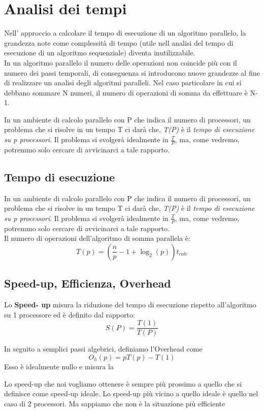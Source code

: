 \documentclass{article}
\begin{document}
\section{Analisi dei tempi}
Nell' approccio a calcolare il tempo di esecuzione di un algoritmo parallelo, la grandezza note come complessità di tempo (utile nell analisi del tempo di esecuzione di un algoritmo sequenziale) diventa inutilizzabile.\\
In un algoritmo parallelo il numero delle operazioni non coincide più con il numero dei passi temporali, di conseguenza si introducono nuove grandezze al fine di realizzare un analisi degli algoritmi paralleli. Nel caso particolare in cui si debbano sommare N numeri, il numero di operazioni di somma da effettuare è N-1.

In un ambiente di calcolo parallelo con P che indica il numero di processori, un problema che si risolve in un tempo T ci darà che, \textit{T(P)} è il \textit{tempo di esecuzione su p processori}. Il problema si svolgerà idealmente in $\frac{T}{P}$, ma, come vedremo, potremmo solo cercare di avvicinarci a tale rapporto. 

\subsection{Tempo di esecuzione}
In un ambiente di calcolo parallelo con P che indica il numero di processori, un problema che si risolve in un tempo T ci darà che, \textit{T(P)} è il \textit{tempo di esecuzione su p processori}. Il problema si svolgerà idealmente in $\frac{T}{P}$, ma, come vedremo, potremmo solo cercare di avvicinarci a tale rapporto.\\
Il numero di operazioni dell'algoritmo di somma parallela è:
$$T(p)=(\frac{n}{p}-1 + \log_2(p))t_{calc}$$

\subsection{Speed-up, Efficienza, Overhead}

Lo \textbf{Speed- up} misura la riduzione del tempo di esecuzione rispetto all'algoritmo su 1 processore ed è definito dal rapporto:
$$ S(P) = \frac{T(1)}{T(P)} $$ 

In seguito a semplici passi algebrici, definiamo l'Overhead come
$$O_h(p) = pT(p) - T(1)$$
Esso è idealmente nullo e misura la 

Lo speed-up che noi vogliamo ottenere è sempre più prossimo a quello che si definisce come speed-up ideale.
Lo speed-up più vicino a quello ideale è quello nel caso di 2 processori. Ma sappiamo che non è la situazione più efficiente
\end{document}
